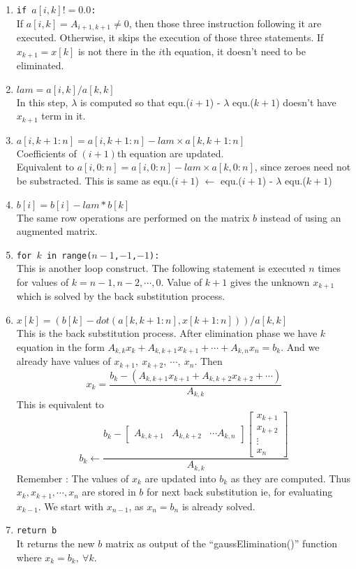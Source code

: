 \begin{commentary}
\begin{enumerate}[label=Line \arabic*]
	\item \texttt{if $a[i,k] != 0.0$:} \\ If $a[i,k] = A_{i+1,k+1} \ne 0$, then those three instruction following it are executed. Otherwise, it skips the execution of those three statements. If $x_{k+1}=x[k]$ is not there in the $i$th equation, it doesn't need to be eliminated.
	\item \texttt{$lam = a[i,k]/a[k,k]$} \\ In this step, $\lambda$ is computed so that equ.($i+1$) - $\lambda$ equ.($k+1$) doesn't have $x_{k+1}$ term in it.
	\item \texttt{$a[i,k+1:n] = a[i,k+1:n]-lam \times a[k,k+1:n]$} \\ Coefficients of $(i+1)$th equation are updated.\\ Equivalent to $a[i,0:n] = a[i,0:n] - lam \times a[k,0:n]$, since zeroes need not be substracted. This is same as equ.($i+1$) $\leftarrow$ equ.($i+1$) - $\lambda$ equ.($k+1$)
	\item \texttt{$b[i] = b[i]-lam*b[k]$} \\ The same row operations are performed on the matrix $b$ instead of using an augmented matrix.
	\item \texttt{for $k$ in range($n-1$,$-1$,$-1$):} \\ This is another loop construct. The following statement is executed $n$ times for values of $k = n-1, n-2, \cdots, 0$. Value of $k+1$ gives the unknown $x_{k+1}$ which is solved by the back substitution process.
	\item \texttt{$x[k] = (b[k]-dot(a[k,k+1:n],x[k+1:n]))/a[k,k]$} \\ This is the back substitution process. After elimination phase we have $k$ equation in the form $A_{k,k}x_{k} + A_{k,k+1}x_{k+1}+\cdots+A_{k,n}x_n = b_k$. And we already have values of $x_{k+1},\ x_{k+2},\ \cdots,\ x_n$. Then
	\[x_{k} = \frac{b_k - (A_{k,k+1}x_{k+1} + A_{k,k+2}x_{k+2}+\cdots)}{A_{k,k}}\]
	This is equivalent to 
	\[ b_k \leftarrow \frac{ b_k - \begin{bmatrix}A_{k,k+1} & A_{k,k+2} & \cdots A_{k,n} \end{bmatrix}\begin{bmatrix} x_{k+1} \\ x_{k+2} \\ \vdots \\ x_n \end{bmatrix}}{A_{k,k}} \]
	Remember : The values of $x_k$ are updated into $b_k$ as they are computed. Thus $x_{k}, x_{k+1}, \cdots, x_n$ are stored in $b$ for next back substitution ie, for evaluating $x_{k-1}$. We start with $x_{n-1}$, as $x_n = b_n$ is already solved.
	\item \texttt{return b} \\ It returns the new $b$ matrix as output of the ``gaussElimination()'' function where $x_k = b_k,\ \forall k$.
\end{enumerate}
\end{commentary}

